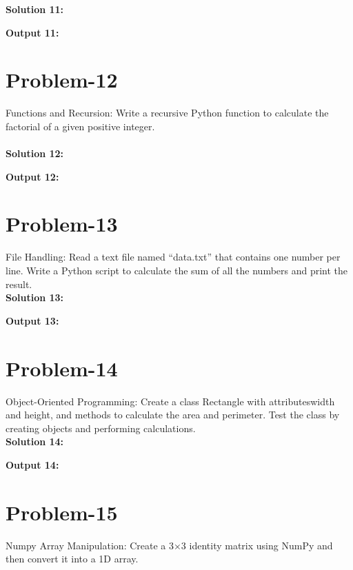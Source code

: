\textbf{Solution 11: }


\textbf{Output 11: }
\\

\section{Problem-12}
Functions and Recursion: Write a recursive Python function to calculate the factorial of a given positive integer.\\\\

\textbf{Solution 12: }


\textbf{Output 12:}
\\

\section{Problem-13}
File Handling: Read a text file named “data.txt” that contains one number per line. Write a Python script to calculate the sum of all the numbers and print the result.\\

\textbf{Solution 13: }


\textbf{Output 13:}
\\

\section{Problem-14}
Object-Oriented Programming: Create a class Rectangle with attributeswidth and height, and methods to calculate the area and perimeter. Test the class by creating objects and performing calculations.\\

\textbf{Solution 14: }


\textbf{Output 14:}
\\

\section{Problem-15}
Numpy Array Manipulation: Create a 3×3 identity matrix using NumPy and then convert it into a 1D array.\\

